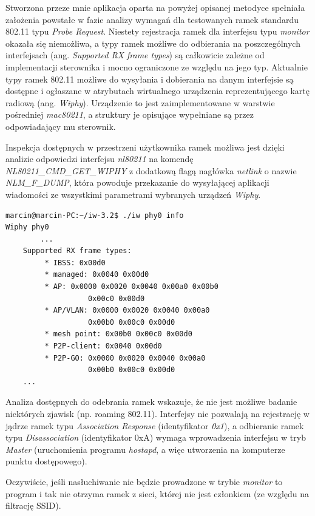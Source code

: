 Stworzona przeze mnie aplikacja oparta na powyżej opisanej metodyce spełniała założenia powstałe w fazie analizy wymagań dla testowanych ramek standardu 802.11 typu \emph{Probe Request}. Niestety rejestracja ramek dla interfejsu typu \emph{monitor} okazała się niemożliwa, a typy ramek możliwe do odbierania na poszczególnych interfejsach (ang. \emph{Supported RX frame types}) są całkowicie zależne od implementacji sterownika i mocno ograniczone ze względu na jego typ. Aktualnie typy ramek 802.11 możliwe do wysyłania i dobierania na danym interfejsie są dostępne i ogłaszane w atrybutach wirtualnego urządzenia reprezentującego kartę radiową (ang. \emph{Wiphy}). Urządzenie to jest zaimplementowane w warstwie pośredniej \emph{mac80211}, a struktury je opisujące wypełniane są przez odpowiadający mu sterownik.

Inspekcja dostępnych w przestrzeni użytkownika ramek możliwa jest dzięki analizie odpowiedzi interfejsu \emph{nl80211} na komendę \emph{NL80211\_CMD\_GET\_WIPHY} z dodatkową flagą nagłówka \emph{netlink} o nazwie \emph{NLM\_F\_DUMP}, która powoduje przekazanie do wysyłającej aplikacji wiadomości ze wszystkimi parametrami wybranych urządzeń \emph{Wiphy}.

\begin{lstlisting}[frame=tb]
marcin@marcin-PC:~/iw-3.2$ ./iw phy0 info
Wiphy phy0
        ...
	Supported RX frame types:
		 * IBSS: 0x00d0
		 * managed: 0x0040 0x00d0
		 * AP: 0x0000 0x0020 0x0040 0x00a0 0x00b0 
                   0x00c0 0x00d0
		 * AP/VLAN: 0x0000 0x0020 0x0040 0x00a0 
                   0x00b0 0x00c0 0x00d0
		 * mesh point: 0x00b0 0x00c0 0x00d0
		 * P2P-client: 0x0040 0x00d0
		 * P2P-GO: 0x0000 0x0020 0x0040 0x00a0 
                   0x00b0 0x00c0 0x00d0
	...
\end{lstlisting}

Analiza dostępnych do odebrania ramek wskazuje, że nie jest możliwe badanie niektórych zjawisk (np. roaming 802.11). Interfejsy nie pozwalają na rejestrację w jądrze ramek typu \emph{Association Response} (identyfikator \emph{0x1}), a odbieranie ramek typu \emph{Disassociation} (identyfikator 0xA) wymaga wprowadzenia interfejsu w tryb \emph{Master} (uruchomienia programu \emph{hostapd}, a więc utworzenia na komputerze punktu dostępowego). 

Oczywiście, jeśli nasłuchiwanie nie będzie prowadzone w trybie \emph{monitor} to program i tak nie otrzyma ramek z sieci, której nie jest członkiem (ze względu na filtrację SSID). 

